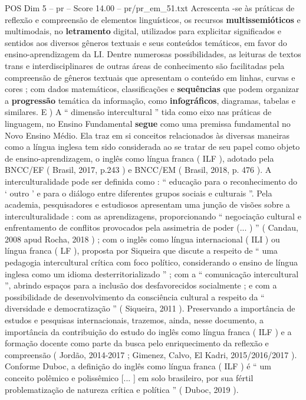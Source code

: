 \begin{textsample}{POS Dim 5 – pr – Score 14.00 – pr/pr\_em\_51.txt}
Acrescenta -se às práticas de reflexão e compreensão de elementos linguísticos, os recursos \textbf{multissemióticos} e multimodais, no \textbf{letramento} digital, utilizados para explicitar significados e sentidos aos diversos gêneros textuais e seus conteúdos temáticos, em favor do ensino-aprendizagem da LI.
Dentre numerosas possibilidades, as leituras de textos trans e interdisciplinares de outras áreas de conhecimento são facilitadas pela compreensão de gêneros textuais que apresentam o conteúdo em linhas, curvas e cores ; com dados matemáticos, classificações e \textbf{sequências} que podem organizar a \textbf{progressão} temática da informação, como \textbf{infográficos}, diagramas, tabelas e similares.
E ) A “ dimensão intercultural ” tida como eixo nas práticas de linguagem, no Ensino Fundamental \textbf{segue} como uma premissa fundamental no Novo Ensino Médio.
Ela traz em si conceitos relacionados às diversas maneiras como a língua inglesa tem sido considerada ao se tratar de seu papel como objeto de ensino-aprendizagem, o inglês como língua franca ( ILF ), adotado pela BNCC/EF ( Brasil, 2017, p.243 ) e BNCC/EM ( Brasil, 2018, p. 476 ).
A interculturalidade pode ser definida como : “ educação para o reconhecimento do ‘ outro ’ e para o diálogo entre diferentes grupos sociais e culturais ”.
Pela academia, pesquisadores e estudiosos apresentam uma junção de visões sobre a interculturalidade : com as aprendizagens, proporcionando “ negociação cultural e enfrentamento de conflitos provocados pela assimetria de poder (... ) ” ( Candau, 2008 apud Rocha, 2018 ) ; com o inglês como língua internacional ( ILI ) ou língua franca ( LF ), proposta por Siqueira que discute a respeito de “ uma pedagogia intercultural crítica com foco político, considerando o ensino de língua inglesa como um idioma desterritorializado ” ; com a “ comunicação intercultural ”, abrindo espaços para a inclusão dos desfavorecidos socialmente ; e com a possibilidade de desenvolvimento da consciência cultural a respeito da “ diversidade e democratização ” ( Siqueira, 2011 ).
Preservando a importância de estudos e pesquisas internacionais, trazemos, ainda, nesse documento, a importância da contribuição do estudo do inglês como língua franca ( ILF ) e a formação docente como parte da busca pelo enriquecimento da reflexão e compreensão ( Jordão, 2014-2017 ; Gimenez, Calvo, El Kadri, 2015/2016/2017 ).
Conforme Duboc, a definição do inglês como língua franca ( ILF ) é “ um conceito polêmico e polissêmico [... ] em solo brasileiro, por sua fértil problematização de natureza crítica e política ” ( Duboc, 2019 ).

\end{textsample}
